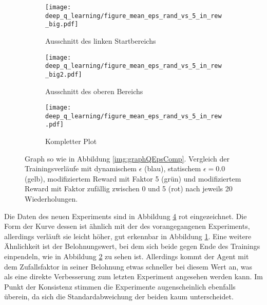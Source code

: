\begin{figure}[h]
    \centering
    \begin{subfigure}[b]{0.49\textwidth}
        \texttt{[image: deep\_q\_learning/figure\_mean\_eps\_rand\_vs\_5\_in\_rew\_big.pdf]}
        \caption{Ausschnitt des linken Startbereichs}
        \label{img:graphEpsRandVs5InRewBig}
    \end{subfigure}
    \begin{subfigure}[b]{0.49\textwidth}
        \texttt{[image: deep\_q\_learning/figure\_mean\_eps\_rand\_vs\_5\_in\_rew\_big2.pdf]}
        \caption{Ausschnitt des oberen Bereichs}
        \label{img:graphEpsRandVs5InRewBig2}
    \end{subfigure}
    \begin{subfigure}[b]{0.7\textwidth}
        \texttt{[image: deep\_q\_learning/figure\_mean\_eps\_rand\_vs\_5\_in\_rew.pdf]}
        \caption{Kompletter Plot}
        \label{img:graphEpsRandVs5InRew}
    \end{subfigure}
    \caption{Graph so wie in Abbildung \ref{img:graphQEpsComp}. Vergleich der Trainingsverläufe mit dynamischem $ \epsilon $ (blau), statischem $ \epsilon = 0.0 $ (gelb), modifiziertem Reward mit Faktor 5 (grün) und modifiziertem Reward mit Faktor zufällig zwischen 0 und 5 (rot) nach jeweils 20 Wiederholungen.}
    \label{img:graphEpsRandVs5InRewBoth}
\end{figure}

Die Daten des neuen Experiments sind in Abbildung \ref{img:graphEpsRandVs5InRewBoth} rot eingezeichnet. Die Form der Kurve dessen ist ähnlich mit der des vorangegangenen Experiments, allerdings verläuft sie leicht höher, gut erkennbar in Abbildung \ref{img:graphEpsRandVs5InRewBig}. Eine weitere Ähnlichkeit ist der Belohnungswert, bei dem sich beide gegen Ende des Trainings einpendeln, wie in Abbildung \ref{img:graphEpsRandVs5InRewBig2} zu sehen ist. Allerdings kommt der Agent mit dem Zufallsfaktor in seiner Belohnung etwas schneller bei diesem Wert an, was als eine direkte Verbesserung zum letzten Experiment angesehen werden kann. Im Punkt der Konsistenz stimmen die Experimente augenscheinlich ebenfalls überein, da sich die Standardabweichung der beiden kaum unterscheidet.

